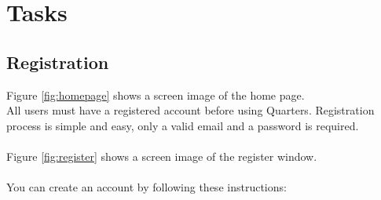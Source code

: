 \documentclass[12pt]{article}
\begin{document}
    \section{Tasks}

    \subsection{Registration}
    \label{sec:registration}
    Figure \ref{fig:homepage} shows a screen image of the home page.\\
    All users must have a registered account before using Quarters. Registration process is simple and easy, only a valid email and a password is required.\\\\
    Figure \ref{fig:register} shows a screen image of the register window.\\\\
    You can create an account by following these instructions:
\end{document}
